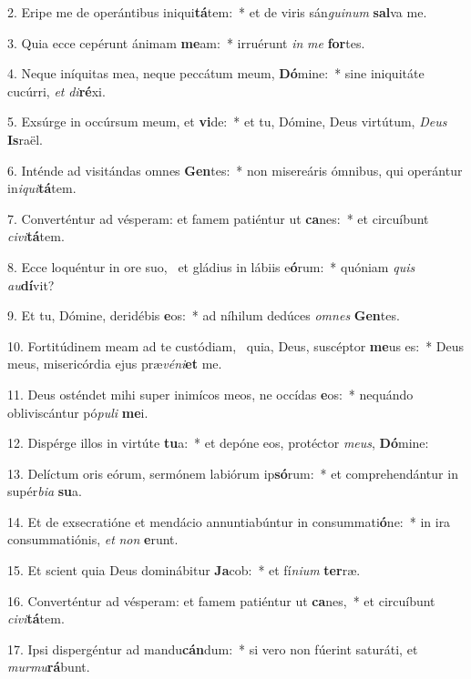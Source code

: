2. Eripe me de operántibus iniqui\textbf{tá}tem:~*  et de viris sán\textit{gui}\textit{num} \textbf{sal}va me.\

3. Quia ecce cepérunt ánimam \textbf{me}am:~*  irruérunt \textit{in} \textit{me} \textbf{for}tes.\

4. Neque iníquitas mea, neque peccátum meum, \textbf{Dó}mine:~*  sine iniquitáte cucúrri, \textit{et} \textit{di}\textbf{ré}xi.\

5. Exsúrge in occúrsum meum, et \textbf{vi}de:~*  et tu, Dómine, Deus virtútum, \textit{De}\textit{us} \textbf{Is}raël.\

6. Inténde ad visitándas omnes \textbf{Gen}tes:~*  non misereáris ómnibus, qui operántur in\textit{i}\textit{qui}\textbf{tá}tem.\

7. Converténtur ad vésperam: et famem patiéntur ut \textbf{ca}nes:~*  et circuíbunt \textit{ci}\textit{vi}\textbf{tá}tem.\

8. Ecce loquéntur in ore suo, \dag\  et gládius in lábiis e\textbf{ó}rum:~*  quóniam \textit{quis} \textit{au}\textbf{dí}vit?\

9. Et tu, Dómine, deridébis \textbf{e}os:~*  ad níhilum dedúces \textit{om}\textit{nes} \textbf{Gen}tes.\

10. Fortitúdinem meam ad te custódiam, \dag\  quia, Deus, suscéptor \textbf{me}us es:~*  Deus meus, misericórdia ejus præ\textit{vé}\textit{ni}\textbf{et} me.\

11. Deus osténdet mihi super inimícos meos, ne occídas \textbf{e}os:~*  nequándo obliviscántur pó\textit{pu}\textit{li} \textbf{me}i.\

12. Dispérge illos in virtúte \textbf{tu}a:~*  et depóne eos, protéctor \textit{me}\textit{us}, \textbf{Dó}mine:\

13. Delíctum oris eórum, sermónem labiórum ip\textbf{só}rum:~*  et comprehendántur in supér\textit{bi}\textit{a} \textbf{su}a.\

14. Et de exsecratióne et mendácio annuntiabúntur in consummati\textbf{ó}ne:~*  in ira consummatiónis, \textit{et} \textit{non} \textbf{e}runt.\

15. Et scient quia Deus dominábitur \textbf{Ja}cob:~*  et fí\textit{ni}\textit{um} \textbf{ter}ræ.\

16. Converténtur ad vésperam: et famem patiéntur ut \textbf{ca}nes,~*  et circuíbunt \textit{ci}\textit{vi}\textbf{tá}tem.\

17. Ipsi dispergéntur ad mandu\textbf{cán}dum:~*  si vero non fúerint saturáti, et \textit{mur}\textit{mu}\textbf{rá}bunt.\

